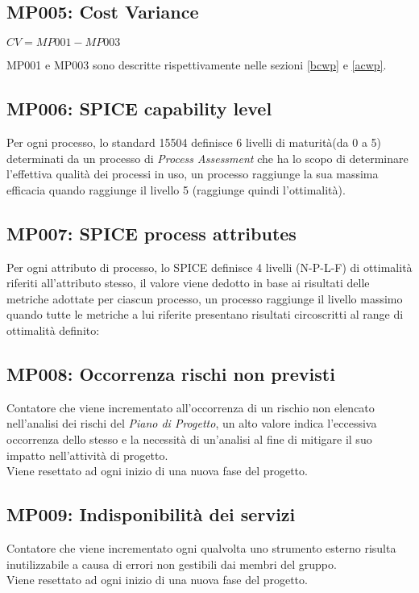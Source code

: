 \subsection{MP005: Cost Variance}
\begin{center}
	\begin{math}
	CV = MP001 - MP003
	\end{math}
\end{center}
MP001 e MP003 sono descritte rispettivamente nelle sezioni \ref{bcwp} e \ref{acwp}.

\subsection{MP006: SPICE capability level}
Per ogni processo, lo standard 15504 definisce 6 livelli di maturità(da 0 a 5) determinati da un processo di  \textit{Process Assessment} che ha lo scopo di determinare l'effettiva qualità dei processi in uso, un processo raggiunge la sua massima efficacia quando raggiunge il livello 5 (raggiunge quindi l'ottimalità).


\subsection{MP007: SPICE process attributes}
Per ogni attributo di processo, lo SPICE definisce 4 livelli (N-P-L-F) di ottimalità riferiti all'attributo stesso, il valore viene dedotto in base ai risultati delle metriche adottate per ciascun processo, un processo raggiunge il livello massimo quando tutte le metriche a lui riferite presentano risultati circoscritti al range di ottimalità definito:

\subsection{MP008: Occorrenza rischi non previsti}
Contatore che viene incrementato all'occorrenza di un rischio non elencato nell'analisi dei rischi del \textit{Piano di Progetto}, un alto valore indica l'eccessiva occorrenza dello stesso e la necessità di un'analisi al fine di mitigare il suo impatto nell'attività di progetto.\\
Viene resettato ad ogni inizio di una nuova fase del progetto.

\subsection{MP009: Indisponibilità dei servizi}
Contatore che viene incrementato ogni qualvolta uno strumento esterno risulta inutilizzabile a causa di errori non gestibili dai membri del gruppo.\\
Viene resettato ad ogni inizio di una nuova fase del progetto.

